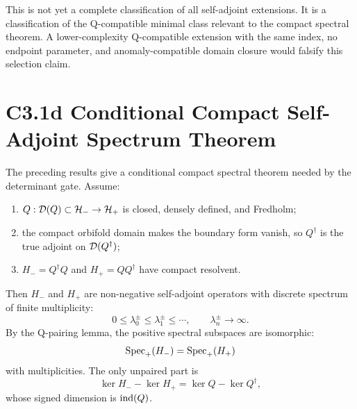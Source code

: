 \documentclass[11pt]{article}
\begin{document}
This is not yet a complete classification of all self-adjoint extensions.  It is
a classification of the Q-compatible minimal class relevant to the compact
spectral theorem.  A lower-complexity Q-compatible extension with the same
index, no endpoint parameter, and anomaly-compatible domain closure would
falsify this selection claim.

\section{C3.1d Conditional Compact Self-Adjoint Spectrum Theorem}
The preceding results give a conditional compact spectral theorem needed by
the determinant gate.  Assume:
\begin{enumerate}
\item $Q:{\cal D}(Q)\subset{\cal H}_-\to{\cal H}_+$ is closed, densely
defined, and Fredholm;
\item the compact orbifold domain makes the boundary form vanish, so
$Q^\dagger$ is the true adjoint on ${\cal D}(Q^\dagger)$;
\item $H_-=Q^\dagger Q$ and $H_+=QQ^\dagger$ have compact resolvent.
\end{enumerate}
Then $H_-$ and $H_+$ are non-negative self-adjoint operators with discrete
spectrum of finite multiplicity:
\begin{equation}
0\leq\lambda_0^\pm\leq\lambda_1^\pm\leq\cdots,\qquad
\lambda_n^\pm\to\infty .
\end{equation}
By the Q-pairing lemma, the positive spectral subspaces are isomorphic:
\begin{equation}
{\rm Spec}_+(H_-)= {\rm Spec}_+(H_+)
\end{equation}
with multiplicities.  The only unpaired part is
\begin{equation}
\ker H_- - \ker H_+ = \ker Q - \ker Q^\dagger,
\end{equation}
whose signed dimension is ${\rm ind}(Q)$.
\end{document}
